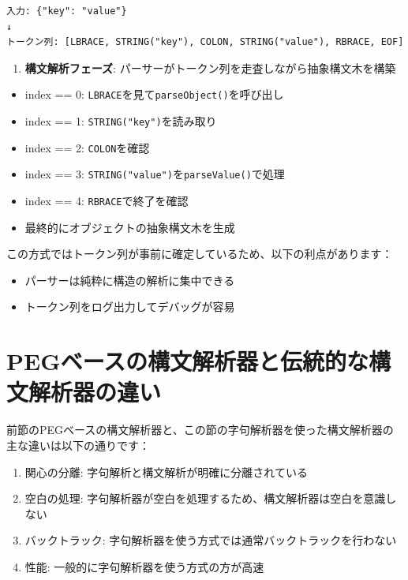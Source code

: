 \begin{verbatim}
入力: {"key": "value"}
↓
トークン列: [LBRACE, STRING("key"), COLON, STRING("value"), RBRACE, EOF]
\end{verbatim}

\begin{enumerate}
\def\labelenumi{\arabic{enumi}.}
\setcounter{enumi}{1}
\tightlist
\item
  \textbf{構文解析フェーズ}:
  パーサーがトークン列を走査しながら抽象構文木を構築
\end{enumerate}

\begin{itemize}
\tightlist
\item
  index == 0: \texttt{LBRACE}を見て\texttt{parseObject()}を呼び出し
\item
  index == 1: \texttt{STRING("key")}を読み取り
\item
  index == 2: \texttt{COLON}を確認
\item
  index == 3: \texttt{STRING("value")}を\texttt{parseValue()}で処理
\item
  index == 4: \texttt{RBRACE}で終了を確認
\item
  最終的にオブジェクトの抽象構文木を生成
\end{itemize}

この方式ではトークン列が事前に確定しているため、以下の利点があります：

\begin{itemize}
\tightlist
\item
  パーサーは純粋に構造の解析に集中できる
\item
  トークン列をログ出力してデバッグが容易
\end{itemize}

\hypertarget{chapter3-pegux30d9ux30fcux30b9ux306eux69cbux6587ux89e3ux6790ux5668ux3068ux4f1dux7d71ux7684ux306aux69cbux6587ux89e3ux6790ux5668ux306eux9055ux3044}{%
\section{PEGベースの構文解析器と伝統的な構文解析器の違い}\label{chapter3-pegux30d9ux30fcux30b9ux306eux69cbux6587ux89e3ux6790ux5668ux3068ux4f1dux7d71ux7684ux306aux69cbux6587ux89e3ux6790ux5668ux306eux9055ux3044}}

前節のPEGベースの構文解析器と、この節の字句解析器を使った構文解析器の主な違いは以下の通りです：

\begin{enumerate}
\def\labelenumi{\arabic{enumi}.}
\tightlist
\item
  関心の分離: 字句解析と構文解析が明確に分離されている
\item
  空白の処理:
  字句解析器が空白を処理するため、構文解析器は空白を意識しない
\item
  バックトラック: 字句解析器を使う方式では通常バックトラックを行わない
\item
  性能: 一般的に字句解析器を使う方式の方が高速
\end{enumerate}

